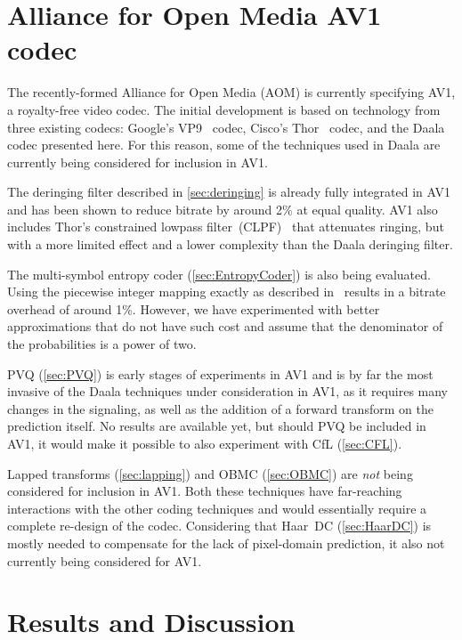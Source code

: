 \documentclass[english,conference,10pt]{IEEEtran}
\begin{document}
\section{Alliance for Open Media AV1 codec}
\label{sec:AOM}

The recently-formed Alliance for Open Media (AOM) is currently specifying
AV1, a royalty-free video codec. The initial development is based on
technology from three existing codecs: Google's VP9~\cite{VP9Spec} codec,
Cisco's Thor~\cite{ThorDraft} codec, and the Daala codec presented
here. For this reason, some of the techniques used in Daala are currently
being considered for inclusion in AV1.

The deringing filter described in \cref{sec:deringing} is already
fully integrated in AV1 and has been shown to reduce bitrate by around 2\%
at equal quality. AV1 also includes Thor's constrained lowpass
filter~(CLPF)~\cite{CLPFDraft} that attenuates ringing, but with a more
limited effect and a lower complexity than the Daala deringing filter.

The multi-symbol entropy coder (\cref{sec:EntropyCoder}) is also being
evaluated. Using the piecewise
integer mapping exactly as described in~\cite{stuiver1998piecewise} results
in a bitrate overhead of around 1\%. However, we have experimented with
better approximations that do not have such cost and assume that
the denominator of the probabilities is a power of two.

PVQ (\cref{sec:PVQ}) is early stages of experiments in AV1 and is by far
the most invasive
of the Daala techniques under consideration in AV1, as it requires many changes
in the signaling, as well as the addition of a forward transform on the
prediction itself. No results are available yet, but should PVQ be
included in AV1, it would make it possible to also experiment with CfL
(\cref{sec:CFL}).

Lapped transforms (\cref{sec:lapping}) and OBMC (\cref{sec:OBMC}) are 
\textit{not} being considered for inclusion
in AV1. Both these techniques have far-reaching interactions with the
other coding techniques and would essentially require a complete re-design
of the codec. Considering that Haar~DC (\cref{sec:HaarDC}) is mostly
needed to compensate for the
lack of pixel-domain prediction, it also not currently being considered for AV1.

\section{Results and Discussion}
\label{sec:Results}
\end{document}
